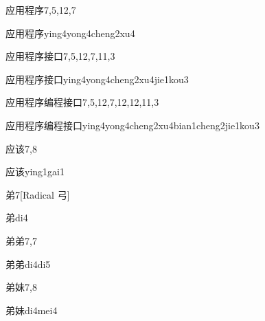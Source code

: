 \begin{entry}{应用程序}{7,5,12,7}
  \begin{phonetics}{应用程序}{ying4yong4cheng2xu4}
  \end{phonetics}
\end{entry}

\begin{entry}{应用程序接口}{7,5,12,7,11,3}
  \begin{phonetics}{应用程序接口}{ying4yong4cheng2xu4jie1kou3}
  \end{phonetics}
\end{entry}

\begin{entry}{应用程序编程接口}{7,5,12,7,12,12,11,3}
  \begin{phonetics}{应用程序编程接口}{ying4yong4cheng2xu4bian1cheng2jie1kou3}
  \end{phonetics}
\end{entry}

\begin{entry}{应该}{7,8}
  \begin{phonetics}{应该}{ying1gai1}
  \end{phonetics}
\end{entry}

\begin{entry}{弟}{7}[Radical 弓]
  \begin{phonetics}{弟}{di4}
  \end{phonetics}
\end{entry}

\begin{entry}{弟弟}{7,7}
  \begin{phonetics}{弟弟}{di4di5}
  \end{phonetics}
\end{entry}

\begin{entry}{弟妹}{7,8}
  \begin{phonetics}{弟妹}{di4mei4}
  \end{phonetics}
\end{entry}


